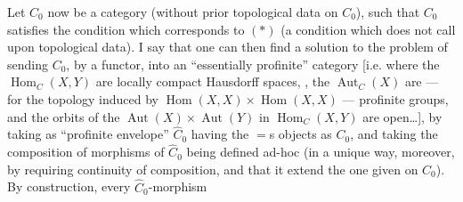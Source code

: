 Let $C_0$ now be a category (without
prior topological data on $C_0$),
such that $C_0$ satisfies the condition
which corresponds to $(*)$ (a condition which does not
call upon topological data).
I say that one can then find a
solution to the problem of sending $C_0$, by a functor,
into an ``essentially profinite'' category 
[i.e. where the $\operatorname{Hom}_C(X,Y)$ are locally compact
Hausdorff spaces, , the $\operatorname{Aut}_C(X)$ are --- for the topology
induced by $\operatorname{Hom}(X,X)\times\operatorname{Hom}(X,X)$ ---
profinite groups, and the orbits of the $\operatorname{Aut}(X)\times\operatorname{Aut}(Y)$
in $\operatorname{Hom}_C(X,Y)$ are open\ldots], by taking
as ``profinite envelope'' $\widehat C_0$  having the
$=$s  objects as $C_0$, and taking
the composition of morphisms of $\widehat C_0$ being
defined ad-hoc (in a unique way, moreover,
by requiring continuity of composition, and
that it extend the one given on $C_0$).
By construction, every $\widehat C_0$-morphism

